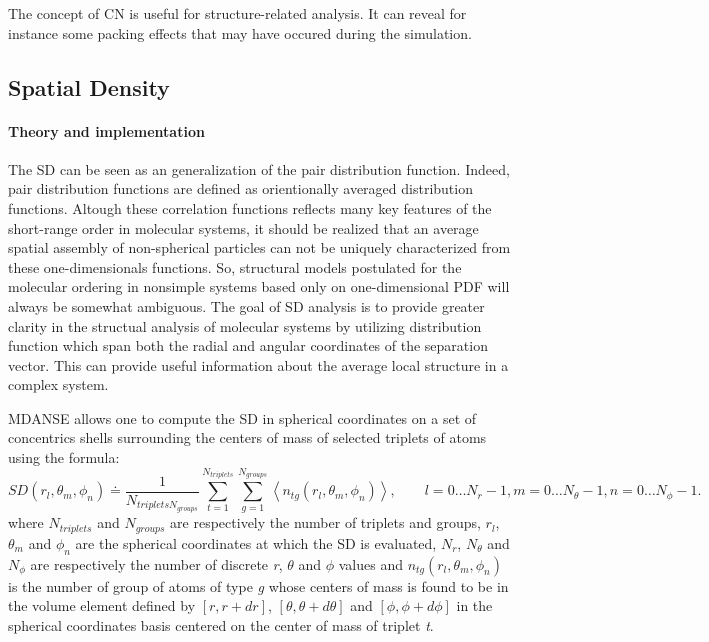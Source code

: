 \documentclass[a4paper,11pt]{article}
\begin{document}
The concept of \gls{CN} is useful for structure-related analysis. It can reveal for instance some packing effects that may have 
occured during the simulation.

\subsection{Spatial Density}
\label{sd}
\paragraph{Theory and implementation\\}
\label{sd_theory}
The \gls{SD} can be seen as an generalization of the pair distribution function. Indeed, pair distribution functions are defined 
as orientionally averaged distribution functions. Altough these correlation functions reflects many 
key features of the short-range order in molecular systems, it should be realized that an average spatial assembly of 
non-spherical particles can not be uniquely characterized from these one-dimensionals functions. So, structural models 
postulated for the molecular ordering in nonsimple systems based only on one-dimensional \gls{PDF} will always be somewhat 
ambiguous. The goal of \gls{SD} analysis is to provide greater clarity in the structual analysis of molecular systems by utilizing 
distribution function which span both the radial and angular coordinates of the separation vector. This can provide useful 
information about the average local structure in a complex system.

\gls{MDANSE} allows one to compute the \gls{SD} in spherical coordinates on a set of concentrics shells surrounding the centers of 
mass of selected triplets of atoms using the formula:
\begin{equation}
\label{eq:sd}
SD(r_l,\theta_m ,\phi_n) \doteq \frac{1}{N_{triplets N_{groups}}}\sum_{t = 1}^{N_{triplets}}\sum_{g = 1}^{N_{groups}} \left\langle n_{tg}(r_l,\theta_m,\phi_n)\right\rangle,
\qquad l = 0\ldots N_r - 1, m = 0\ldots N_{\theta} - 1, n = 0\ldots N_{\phi} - 1.
\end{equation}
where $N_{triplets}$ and $N_{groups}$ are respectively the number of triplets and groups, $r_l$, $\theta_m$ and $\phi_n$ are the spherical coordinates at which the \gls{SD} is evaluated, 
$N_r$, $N_{\theta}$ and $N_{\phi}$ are respectively the number of discrete \textit{r}, $\theta$ and $\phi$ values and 
$n_{tg}(r_l,\theta_m,\phi_n)$ is the number of group of atoms of type \textit{g} whose centers of mass is found 
to be in the volume element defined by $[r, r+dr]$, $[\theta , \theta + d\theta]$ and $[\phi , \phi + d\phi]$ in the 
spherical coordinates basis centered on the center of mass of triplet \textit{t}.
\end{document}
